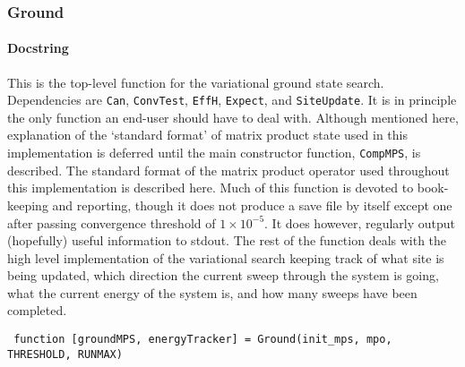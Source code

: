  \subsubsection{Ground}
 \paragraph{Docstring}
 This is the top-level function for the variational ground state search. Dependencies are \lstinline$Can$, \lstinline$ConvTest$, \lstinline$EffH$, \lstinline$Expect$, and \lstinline$SiteUpdate$. It is in principle the only function an end-user should have to deal with. Although mentioned here, explanation of the `standard format' of matrix product state used in this implementation is deferred until the main constructor function, \lstinline$CompMPS$, is described. The standard format of the matrix product operator used throughout this implementation is described here. Much of this function is devoted to book-keeping and reporting, though it does not produce a save file by itself except one after passing convergence threshold of \(1 \times 10^{-5}\). It does however, regularly output (hopefully) useful information to stdout. The rest of the function deals with the high level implementation of the variational search keeping track of what site is being updated, which direction the current sweep through the system is going, what the current energy of the system is, and how many sweeps have been completed. 
 \begin{lstlisting} 
 function [groundMPS, energyTracker] = Ground(init_mps, mpo, THRESHOLD, RUNMAX) \end{lstlisting}
